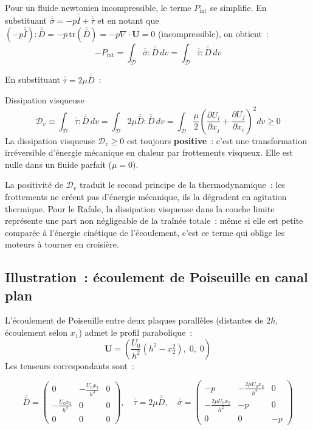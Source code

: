 \documentclass[11pt,a4paper]{report}
\newcommand{\pd}[2]{\dfrac{\partial #1}{\partial #2}}
\newcommand{\ten}[1]{\overline{\overline{#1}}}   %
\begin{document}
Pour un fluide newtonien incompressible, le terme $P_\text{int}$ se simplifie.
En substituant $\ten{\sigma}=-p\ten{I}+\ten{\tau}$ et en notant que
$(-p\ten{I}):\ten{D} = -p\,\text{tr}(\ten{D}) = -p\nabla\cdot\bm{U}=0$
(incompressible), on obtient~:
\[
    -P_\text{int} = \int_{\mathcal{D}}\ten{\sigma}:\ten{D}\,dv
    = \int_{\mathcal{D}}\ten{\tau}:\ten{D}\,dv
\]

En substituant $\ten{\tau}=2\mu\ten{D}$~:

\begin{importantbox}{Dissipation visqueuse}
\[
    \mathcal{D}_v \equiv \int_{\mathcal{D}}\ten{\tau}:\ten{D}\,dv
    = \int_{\mathcal{D}} 2\mu\ten{D}:\ten{D}\,dv
    = \int_{\mathcal{D}} \frac{\mu}{2}\left(\pd{U_i}{x_j}+\pd{U_j}{x_i}\right)^2 dv \geq 0
\]
La dissipation visqueuse $\mathcal{D}_v \geq 0$ est toujours \textbf{positive}~:
c'est une transformation irréversible d'énergie mécanique en chaleur par
frottements visqueux. Elle est nulle dans un fluide parfait ($\mu=0$).
\end{importantbox}

La positivité de $\mathcal{D}_v$ traduit le second principe de la thermodynamique~:
les frottements ne créent pas d'énergie mécanique, ils la dégradent en agitation
thermique. Pour le Rafale, la dissipation visqueuse dans la couche limite représente
une part non négligeable de la traînée totale~: même si elle est petite comparée à
l'énergie cinétique de l'écoulement, c'est ce terme qui oblige les moteurs à
tourner en croisière.

\subsection{Illustration~: écoulement de Poiseuille en canal plan}

L'écoulement de Poiseuille entre deux plaques parallèles (distantes de $2h$,
écoulement selon $x_1$) admet le profil parabolique~:
\[
    \bm{U} = \left(\frac{U_0}{h^2}(h^2-x_2^2),\;0,\;0\right)
\]
Les tenseurs correspondants sont~:

\[
    \ten{D} = \begin{pmatrix} 0 & -\frac{U_0 x_2}{h^2} & 0 \\[4pt] -\frac{U_0 x_2}{h^2} & 0 & 0 \\ 0 & 0 & 0 \end{pmatrix},
    \quad
    \ten{\tau} = 2\mu\ten{D},
    \quad
    \ten{\sigma} = \begin{pmatrix} -p & -\frac{2\mu U_0 x_2}{h^2} & 0 \\[4pt] -\frac{2\mu U_0 x_2}{h^2} & -p & 0 \\ 0 & 0 & -p \end{pmatrix}
\]
\end{document}
